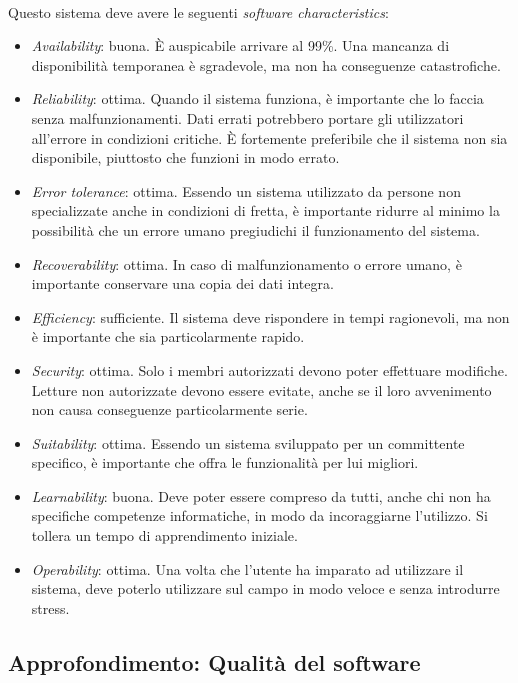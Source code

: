 \documentclass[12pt,a4paper,twoside,english,italian]{book}
\begin{document}
\paragraph{} Questo sistema deve avere le seguenti \emph{software characteristics}:
\begin{itemize}
    \item \emph{Availability}: buona. È auspicabile arrivare al 99\%. Una mancanza di disponibilità temporanea è sgradevole, ma non ha conseguenze catastrofiche. 
    \item \emph{Reliability}: ottima. Quando il sistema funziona, è importante che lo faccia senza malfunzionamenti. Dati errati potrebbero portare gli utilizzatori all'errore in condizioni critiche. È fortemente preferibile che il sistema non sia disponibile, piuttosto che funzioni in modo errato.
    \item \emph{Error tolerance}: ottima. Essendo un sistema utilizzato da persone non specializzate anche in condizioni di fretta, è importante ridurre al minimo la possibilità che un errore umano pregiudichi il funzionamento del sistema. 
    \item \emph{Recoverability}: ottima. In caso di malfunzionamento o errore umano, è importante conservare una copia dei dati integra. 
    \item \emph{Efficiency}: sufficiente. Il sistema deve rispondere in tempi ragionevoli, ma non è importante che sia particolarmente rapido. 
    \item \emph{Security}: ottima. Solo i membri autorizzati devono poter effettuare modifiche. Letture non autorizzate devono essere evitate, anche se il loro avvenimento non causa conseguenze particolarmente serie. 
    \item \emph{Suitability}: ottima. Essendo un sistema sviluppato per un committente specifico, è importante che offra le funzionalità per lui migliori. 
    \item \emph{Learnability}: buona. Deve poter essere compreso da tutti, anche chi non ha specifiche competenze informatiche, in modo da incoraggiarne l'utilizzo. Si tollera un tempo di apprendimento iniziale.
    \item \emph{Operability}: ottima. Una volta che l'utente ha imparato ad utilizzare il sistema, deve poterlo utilizzare sul campo in modo veloce e senza introdurre stress.
\end{itemize}


\subsection{Approfondimento: Qualità del software}
\end{document}

